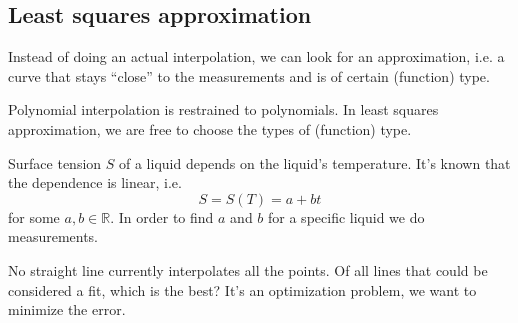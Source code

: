 \subsection{Least squares approximation}

Instead of doing an actual interpolation, we can look for an approximation, i.e. a curve that stays
``close'' to the measurements and is of certain (function) type.

Polynomial interpolation is restrained to polynomials. In least squares
approximation, we are free to choose the types of (function) type.

\begin{example}
    Surface tension $S$ of a liquid depends on the liquid's temperature. It's known that the dependence is linear, i.e.
    \[ S = S(T) = a + bt \]
    for some $a, b \in \mathbb{R}$. In order to find $a$ and $b$ for a specific liquid we do measurements.
    \begin{center}   
    \end{center}
    No straight line currently interpolates all the points.
    Of all lines that could be considered a fit, which is the best?
    It's an optimization problem, we want to minimize the error.


\end{example}
